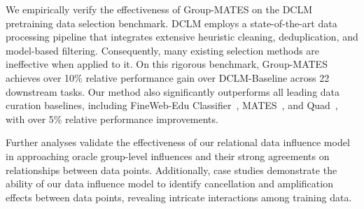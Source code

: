 
We empirically verify the effectiveness of Group-MATES on the DCLM~\cite{li2024datacomp} pretraining data selection benchmark. DCLM employs a state-of-the-art data processing pipeline that integrates extensive heuristic cleaning, deduplication, and model-based filtering. Consequently, many existing selection methods are ineffective when applied to it.
On this rigorous benchmark, Group-MATES achieves over 10\% relative performance gain over DCLM-Baseline across 22 downstream tasks. Our method also significantly outperforms all leading data curation baselines, including FineWeb-Edu Classifier~\cite{penedo2024fineweb}, MATES~\cite{yu2024mates}, and Quad~\cite{zhang2024quad}, with over 5\% relative performance improvements.


Further analyses validate the effectiveness of our relational data influence model in approaching oracle group-level influences and their strong agreements on relationships between data points. Additionally, case studies demonstrate the ability of our data influence model to identify cancellation and amplification effects between data points, revealing intricate interactions among training data.

